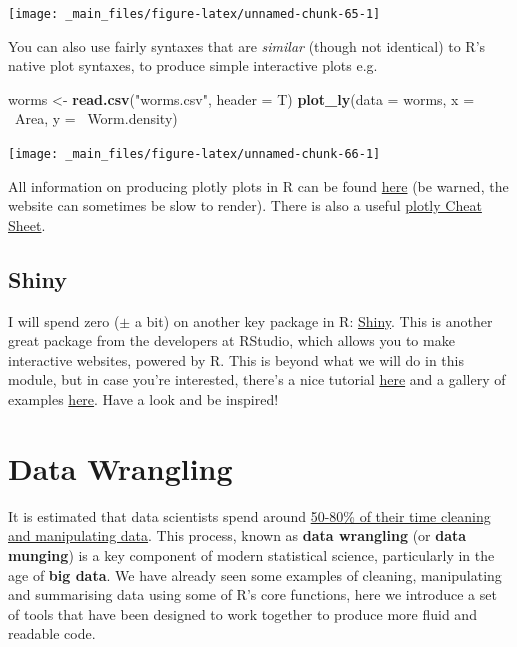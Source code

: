 \documentclass[]{book}
\newenvironment{Shaded}{\begin{snugshade}}{\end{snugshade}}
\newcommand{\KeywordTok}[1]{\textcolor[rgb]{0.13,0.29,0.53}{\textbf{{#1}}}}
\newcommand{\DataTypeTok}[1]{\textcolor[rgb]{0.13,0.29,0.53}{{#1}}}
\newcommand{\StringTok}[1]{\textcolor[rgb]{0.31,0.60,0.02}{{#1}}}
\newcommand{\NormalTok}[1]{{#1}}
\theoremstyle{definition}
\theoremstyle{definition}
\theoremstyle{definition}
\theoremstyle{remark}
\begin{document}
\begin{center}\texttt{[image: \_main\_files/figure-latex/unnamed-chunk-65-1]} \end{center}

You can also use fairly syntaxes that are \emph{similar} (though not
identical) to R's native plot syntaxes, to produce simple interactive
plots e.g.

\begin{Shaded}
\begin{Highlighting}[]
\NormalTok{worms <-}\StringTok{ }\KeywordTok{read.csv}\NormalTok{(}\StringTok{"worms.csv"}\NormalTok{, }\DataTypeTok{header =} \NormalTok{T)}
\KeywordTok{plot_ly}\NormalTok{(}\DataTypeTok{data =} \NormalTok{worms, }\DataTypeTok{x =} \NormalTok{~Area, }\DataTypeTok{y =} \NormalTok{~Worm.density)}
\end{Highlighting}
\end{Shaded}

\begin{center}\texttt{[image: \_main\_files/figure-latex/unnamed-chunk-66-1]} \end{center}

All information on producing plotly plots in R can be found
\href{https://plot.ly/r/}{here} (be warned, the website can sometimes be
slow to render). There is also a useful
\href{https://images.plot.ly/plotly-documentation/images/r_cheat_sheet.pdf}{plotly
Cheat Sheet}.

\section{Shiny}\label{shiny}

I will spend zero (\(\pm\) a bit) on another key package in R:
\href{https://shiny.rstudio.com/}{Shiny}. This is another great package
from the developers at RStudio, which allows you to make interactive
websites, powered by R. This is beyond what we will do in this module,
but in case you're interested, there's a nice tutorial
\href{https://shiny.rstudio.com/}{here} and a gallery of examples
\href{https://shiny.rstudio.com/gallery/}{here}. Have a look and be
inspired!

\chapter{Data Wrangling}\label{data-wrangling}

It is estimated that data scientists spend around
\href{https://www.nytimes.com/2014/08/18/technology/for-big-data-scientists-hurdle-to-insights-is-janitor-work.html?_r=0}{50-80\%
of their time cleaning and manipulating data}. This process, known as
\textbf{data wrangling} (or \textbf{data munging}) is a key component of
modern statistical science, particularly in the age of \textbf{big
data}. We have already seen some examples of cleaning, manipulating and
summarising data using some of R's core functions, here we introduce a
set of tools that have been designed to work together to produce more
fluid and readable code.
\end{document}
